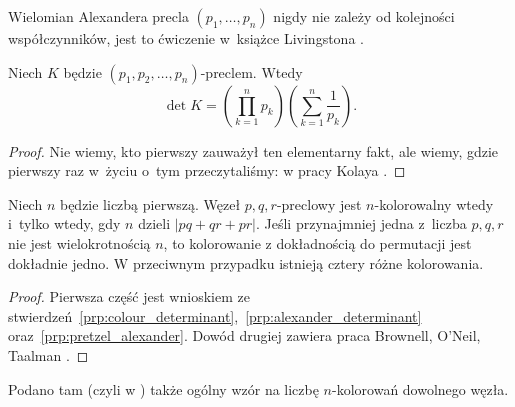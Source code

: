 Wielomian Alexandera precla $(p_1, \ldots, p_n)$ nigdy nie zależy od kolejności współczynników, jest to ćwiczenie w~książce Livingstona \cite[s. 215]{livingston1993}.

\begin{proposition}
    Niech $K$ będzie $(p_1, p_2, \ldots, p_n)$-preclem.
    Wtedy
    \begin{equation}
        \det K = \left(\prod_{k=1}^n p_k\right) \left( \sum_{k=1}^n \frac{1}{p_k}\right).
    \end{equation}
\end{proposition}

\begin{proof}
    Nie wiemy, kto pierwszy zauważył ten elementarny fakt, ale wiemy, gdzie pierwszy raz w~życiu o~tym przeczytaliśmy: w pracy Kolaya \cite[s. 14]{kolay2019}.
\end{proof}

\begin{proposition}
%
    Niech $n$ będzie liczbą pierwszą.
    Węzeł $p, q, r$-preclowy jest $n$-kolorowalny wtedy i~tylko wtedy, gdy $n$ dzieli $|pq+qr+pr|$.
    Jeśli przynajmniej jedna z~liczba $p, q, r$ nie jest wielokrotnością $n$, to kolorowanie z dokładnością do permutacji jest dokładnie jedno.
    W przeciwnym przypadku istnieją cztery różne kolorowania.
\end{proposition}

\begin{proof}
%
%
%
    Pierwsza część jest wnioskiem ze stwierdzeń~\ref{prp:colour_determinant},~\ref{prp:alexander_determinant} oraz~\ref{prp:pretzel_alexander}.
    Dowód drugiej zawiera praca Brownell, O'Neil, Taalman \cite[s. 11]{taalman2005}.
\end{proof}

Podano tam (czyli w \cite{taalman2005}) także ogólny wzór na liczbę $n$-kolorowań dowolnego węzła.

%


